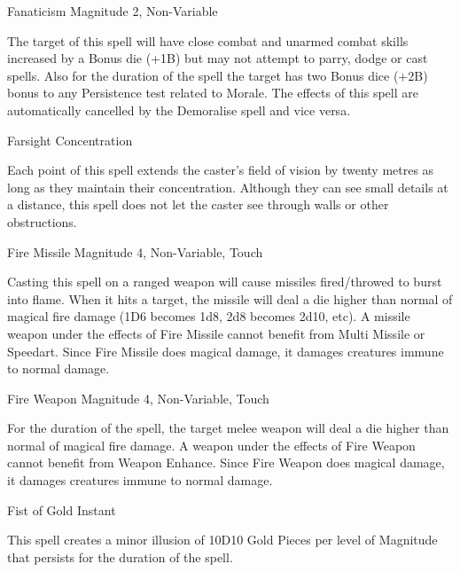 \begin{rpg-spell}
{Fanaticism}
{Magnitude 2, Non-Variable}

The target of this spell will have close combat and unarmed combat skills increased by a Bonus die (+1B) but may not attempt to parry, dodge or cast spells. Also for the duration of the spell the target has two Bonus dice (+2B) bonus to any Persistence test related to Morale. The effects of this spell are automatically cancelled by the Demoralise spell and vice versa.
\end{rpg-spell}


\begin{rpg-spell}
{Farsight}
{Concentration}

Each point of this spell extends the caster’s field of vision by twenty metres as long as they maintain their concentration. Although they can see small details at a distance, this spell does not let the caster see through walls or other obstructions.
\end{rpg-spell}


\begin{rpg-spell}
{Fire Missile}
{Magnitude 4, Non-Variable, Touch}

Casting this spell on a ranged weapon will cause missiles fired/throwed to burst into flame. When it hits a target, the missile will deal a die higher than normal of magical fire damage (1D6 becomes 1d8, 2d8 becomes 2d10, etc). A missile weapon under the effects of Fire Missile cannot benefit from Multi Missile or Speedart. Since Fire Missile does magical damage, it damages creatures immune to normal damage.
\end{rpg-spell}


\begin{rpg-spell}
{Fire Weapon}
{Magnitude 4, Non-Variable, Touch}

For the duration of the spell, the target melee weapon will deal a die higher than normal of magical fire damage. A weapon under the effects of Fire Weapon cannot benefit from Weapon Enhance. Since Fire Weapon does magical damage, it damages creatures immune to normal damage.
\end{rpg-spell}


\begin{rpg-spell}
{Fist of Gold}
{Instant}

This spell creates a minor illusion of 10D10 Gold Pieces per level of Magnitude that persists for the duration of the spell.
\end{rpg-spell}


